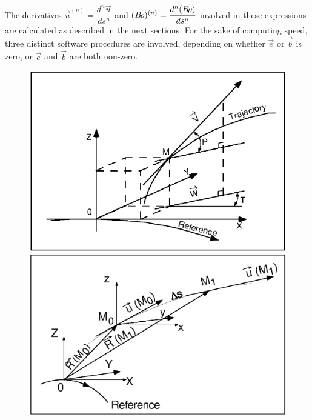 \noindent The derivatives $\vec  u^{(n)} = \dfrac{d^n\vec  u}{ds^n}$ and 
$ (B\!\rho )^{(n)} = \dfrac{d^n(B\!\rho )}{ds^n} $
involved in these expressions are calculated as described in the next sections. 
For the sake of computing speed, three distinct software procedures are involved, depending on 
whether $\vec e$ or $\vec  b$ is zero, or $ \vec e$ and $ \vec b$ are 
both non-zero.

\vspace{0cm}
\begin{figure}[H]
\centerline{\includegraphics[width=14cm]{Fig1.ps}}
\vspace{.3cm}
\centerline{\includegraphics[width=14cm]{Fig2.ps}}

\end{figure}
